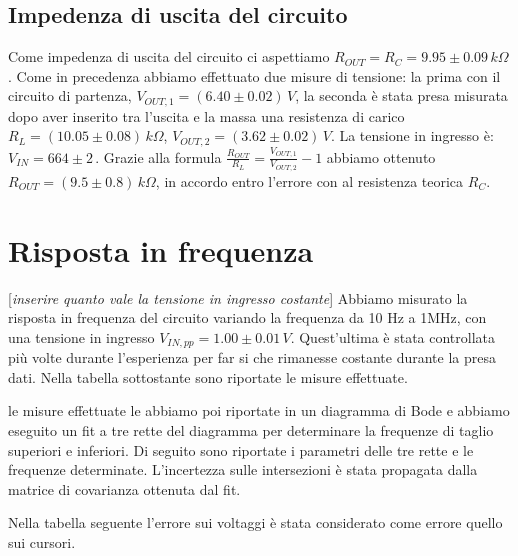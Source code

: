 \documentclass[10pt,a4paper]{article}
\newcommand{\rem}[1]{[\emph{#1}]}
\begin{document}
\subsection{Impedenza di uscita del circuito}
Come impedenza di uscita del circuito ci aspettiamo $R_{OUT}= R_C = 9.95\pm0.09\, k\Omega$. Come in precedenza abbiamo effettuato due misure di tensione: la prima con il circuito di partenza, $V_{OUT,1}= (6.40\pm0.02) \, V$, la seconda è stata presa misurata dopo aver inserito tra l'uscita e la massa una resistenza di carico $R_L = (10.05 \pm 0.08) \, k\Omega$, $V_{OUT,2}= (3.62\pm0.02)\,V$. La tensione in ingresso è: $V_{IN} = 664 \pm 2 \,$. Grazie alla formula $\frac{R_{OUT}}{R_{L}}=\frac{V_{OUT,1}}{V_{OUT,2}}-1$ abbiamo ottenuto $R_{OUT}= (9.5\pm0.8)\, k\Omega$, in accordo entro l'errore con al resistenza teorica $R_C$.


\section{Risposta in frequenza}
\rem{inserire quanto vale la tensione in ingresso costante}
Abbiamo misurato la risposta in frequenza del circuito variando la frequenza da 10 Hz a 1MHz, con una tensione in ingresso $V_{IN,pp}= 1.00 \pm 0.01\, V$. Quest'ultima è stata controllata più volte durante l'esperienza per far si che rimanesse costante durante la presa dati. Nella tabella sottostante sono riportate le misure effettuate.

le misure effettuate le abbiamo poi riportate in un diagramma di Bode e abbiamo eseguito un fit a tre rette del diagramma per determinare la frequenze di taglio superiori e inferiori. Di seguito sono riportate i parametri delle tre rette e le frequenze determinate. L'incertezza sulle intersezioni è stata propagata dalla matrice di covarianza ottenuta dal fit. 

Nella tabella seguente l'errore sui voltaggi è stata considerato come errore quello sui cursori.
\end{document}
